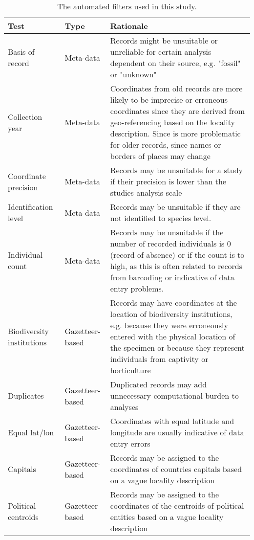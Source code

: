 \documentclass[
  12pt,
]{article}
\begin{document}
\begin{table}[!h]

\caption{\label{tab:tabletests}The automated filters used in this study.}
\centering
\fontsize{9}{11}\selectfont
\begin{tabular}[t]{>{\raggedright\arraybackslash}p{2cm}>{\raggedright\arraybackslash}p{2.5cm}>{\raggedright\arraybackslash}p{10cm}}
\toprule
Test & Type & Rationale\\
\midrule
\rowcolor{gray!6}  Basis of record & Meta-data & Records might be unsuitable or unreliable for certain analysis dependent on their source, e.g. "fossil" or "unknown"\\
Collection year & Meta-data & Coordinates from old records are more likely to be imprecise or erroneous coordinates since they are derived from  geo-referencing based on the locality description. Since is more problematic for older records, since names or borders of places may change\\
\rowcolor{gray!6}  Coordinate precision & Meta-data & Records may be unsuitable for a study if their precision is lower than the studies analysis scale\\
Identification level & Meta-data & Records may be unsuitable if they are not identified to species level.\\
\rowcolor{gray!6}  Individual count & Meta-data & Records may be unsuitable if the number of recorded individuals is 0 (record of absence) or if the count is to high, as this is often related to records from barcoding or indicative of data entry problems.\\
\addlinespace
Biodiversity institutions & Gazetteer-based & Records may have coordinates at the location of biodiversity institutions, e.g. because they were erroneously entered with the physical location of the specimen or because they represent individuals from captivity or horticulture\\
\rowcolor{gray!6}  Duplicates & Gazetteer-based & Duplicated records may add unnecessary computational burden to analyses\\
Equal lat/lon & Gazetteer-based & Coordinates with equal latitude and longitude are usually indicative of data entry errors\\
\rowcolor{gray!6}  Capitals & Gazetteer-based & Records may be assigned to the coordinates of countries capitals based on a vague locality description\\
Political centroids & Gazetteer-based & Records may be assigned to the coordinates of the centroids of political entities based on a vague locality description\\

\end{tabular}
\end{table}
\end{document}
